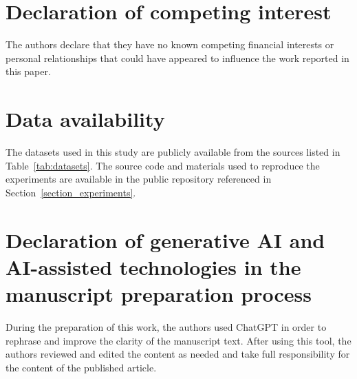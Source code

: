 \documentclass[a4paper,fleqn]{cas-sc}
\begin{document}
\section*{Declaration of competing interest}
The authors declare that they have no known competing financial interests or personal relationships that could have appeared to influence the work reported in this paper.

\section*{Data availability}
The datasets used in this study are publicly available from the sources listed in Table~\ref{tab:datasets}. The source code and materials used to reproduce the experiments are available in the public repository referenced in Section~\ref{section_experiments}.

\section*{Declaration of generative AI and AI-assisted technologies in the manuscript preparation process}

During the preparation of this work, the authors used ChatGPT in order to rephrase and improve the clarity of the manuscript text. After using this tool, the authors reviewed and edited the content as needed and take full responsibility for the content of the published article.




% 



\end{document}
